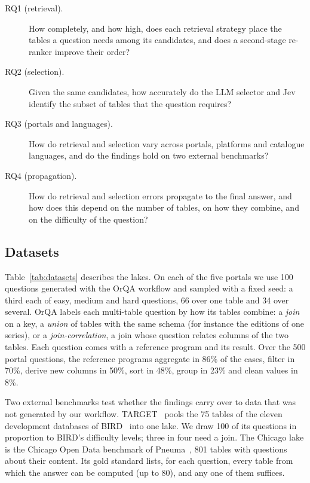 \begin{description}
\item[RQ1 (retrieval).] How completely, and how high, does each retrieval
strategy place the tables a question needs among its candidates, and does a
second-stage re-ranker improve their order?
\item[RQ2 (selection).] Given the same candidates, how accurately do the LLM
selector and Jev identify the subset of tables that the question requires?
\item[RQ3 (portals and languages).] How do retrieval and selection vary across
portals, platforms and catalogue languages, and do the findings hold on two
external benchmarks?
\item[RQ4 (propagation).] How do retrieval and selection errors propagate to
the final answer, and how does this depend on the number of tables, on how
they combine, and on the difficulty of the question?
\end{description}


\subsection{Datasets}
\label{sec:datasets}

Table~\ref{tab:datasets} describes the lakes. On each of the five portals we
use 100 questions generated with the OrQA workflow and sampled with a fixed
seed: a third each of easy, medium and hard questions, 66 over one table and
34 over several. OrQA labels each multi-table question by how its tables
combine: a \emph{join} on a key, a \emph{union} of tables with the same schema
(for instance the editions of one series), or a \emph{join-correlation}, a
join whose question relates columns of the two tables. Each question comes
with a reference program and its result. Over the 500 portal questions, the
reference programs aggregate in 86\% of the cases, filter in 70\%, derive new
columns in 50\%, sort in 48\%, group in 23\% and clean values in 8\%.

Two external benchmarks test whether the findings carry over to data that was
not generated by our workflow. TARGET~\cite{ji2025target} pools the 75 tables
of the eleven development databases of BIRD~\cite{li2023bird} into one lake.
We draw 100 of its questions in proportion to BIRD's difficulty levels; three
in four need a join. The Chicago lake is the Chicago Open Data benchmark of
Pneuma~\cite{pneuma}, 801 tables with questions about their content. Its gold
standard lists, for each question, every table from which the answer can be
computed (up to 80), and any one of them suffices.

